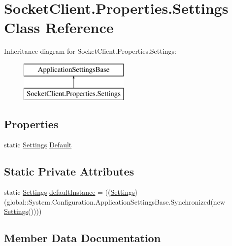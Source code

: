 \hypertarget{class_socket_client_1_1_properties_1_1_settings}{}\section{Socket\+Client.\+Properties.\+Settings Class Reference}
\label{class_socket_client_1_1_properties_1_1_settings}
Inheritance diagram for Socket\+Client.\+Properties.\+Settings\+:\begin{figure}[H]
\begin{center}
\leavevmode
\includegraphics[height=2.000000cm]{class_socket_client_1_1_properties_1_1_settings}
\end{center}
\end{figure}
\subsection*{Properties}
\begin{DoxyCompactItemize}
\item 
static \hyperlink{class_socket_client_1_1_properties_1_1_settings}{Settings} \hyperlink{class_socket_client_1_1_properties_1_1_settings_a052759b480879768820530ea7d850247}{Default}
\end{DoxyCompactItemize}
\subsection*{Static Private Attributes}
\begin{DoxyCompactItemize}
\item 
static \hyperlink{class_socket_client_1_1_properties_1_1_settings}{Settings} \hyperlink{class_socket_client_1_1_properties_1_1_settings_a5bc40a9d598e5dfb06cf56795afe980d}{default\+Instance} = ((\hyperlink{class_socket_client_1_1_properties_1_1_settings}{Settings})(global\+::\+System.\+Configuration.\+Application\+Settings\+Base.\+Synchronized(new \hyperlink{class_socket_client_1_1_properties_1_1_settings}{Settings}())))
\end{DoxyCompactItemize}


\subsection{Member Data Documentation}
\mbox{\label{class_socket_client_1_1_properties_1_1_settings_a5bc40a9d598e5dfb06cf56795afe980d}} 
